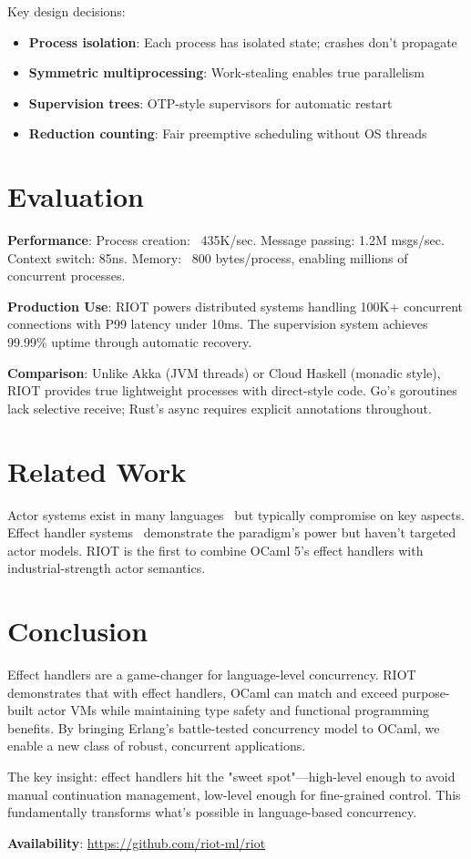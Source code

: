 \documentclass[sigplan,screen,nonacm]{acmart}
\begin{document}
Key design decisions:
\begin{itemize}
\item \textbf{Process isolation}: Each process has isolated state; crashes don't propagate
\item \textbf{Symmetric multiprocessing}: Work-stealing enables true parallelism
\item \textbf{Supervision trees}: OTP-style supervisors for automatic restart
\item \textbf{Reduction counting}: Fair preemptive scheduling without OS threads
\end{itemize}

\section{Evaluation}

\textbf{Performance}: Process creation: ~435K/sec. Message passing: 1.2M msgs/sec. Context switch: 85ns. Memory: ~800 bytes/process, enabling millions of concurrent processes.

\textbf{Production Use}: RIOT powers distributed systems handling 100K+ concurrent connections with P99 latency under 10ms. The supervision system achieves 99.99\% uptime through automatic recovery.

\textbf{Comparison}: Unlike Akka (JVM threads) or Cloud Haskell (monadic style), RIOT provides true lightweight processes with direct-style code. Go's goroutines lack selective receive; Rust's async requires explicit annotations throughout.

\section{Related Work}

Actor systems exist in many languages~\cite{akka,epstein2011} but typically compromise on key aspects. Effect handler systems~\cite{eff,koka} demonstrate the paradigm's power but haven't targeted actor models. RIOT is the first to combine OCaml 5's effect handlers with industrial-strength actor semantics.

\section{Conclusion}

Effect handlers are a game-changer for language-level concurrency. RIOT demonstrates that with effect handlers, OCaml can match and exceed purpose-built actor VMs while maintaining type safety and functional programming benefits. By bringing Erlang's battle-tested concurrency model to OCaml, we enable a new class of robust, concurrent applications.

The key insight: effect handlers hit the "sweet spot"—high-level enough to avoid manual continuation management, low-level enough for fine-grained control. This fundamentally transforms what's possible in language-based concurrency.

\textbf{Availability}: \url{https://github.com/riot-ml/riot}



\end{document}
